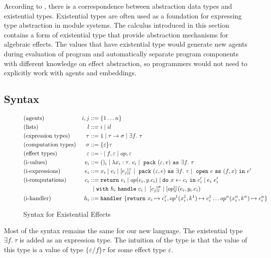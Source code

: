 According to \citet{mitchell88}, there is a correspondence between abstraction data types and existential types. Existential types are often used as a foundation for expressing type abstraction in module systems. The  calculus introduced in this section contains a form of existential type that provide abstraction mechanisms for algebraic effects.  The values that have existential type would generate new agents during evaluation of program and automatically separate program components with different knowledge on effect abstraction, so programmers would not need to explicitly work with agents and embeddings.

\subsection{Syntax}
\begin{figure}
\label{fig-syntax}
\begin{align*}
&\text{(agents)} &i, j &::= \{1 \dots n\}\\
&\text{(lists)} & l &::= i \mid il\\
&\text{(expression types)} &\tau &::= 1 \mid \tau \rightarrow \sigma \mid \exists f.\ \tau \\
&\text{(computation types)} &\sigma &::= \{\varepsilon\}\tau\\
&\text{(effect types)} &\varepsilon &::= \cdot \mid f, \varepsilon \mid op, \varepsilon\\
&\text{(i-values)} &{v_i} &::= ()_i \mid \lambda x_i:\tau.\ c_i \mid \m{pack} (\varepsilon, v) \m{as} \exists f.\ \tau\\
&\text{(i-expressions)} &e_i &::= x_i \mid v_i \mid [e_j]^\tau_l \mid \m{pack} (\varepsilon, e) \m{as} \exists f.\ \tau  \mid \m{open} e \m{as} (f, x) \m{in} e'\\
&\text{(i-computations)} &c_i &::= \texttt{return}\ e_i \mid op(e_i, y.c_i) \mid \texttt{do}\ x \leftarrow c_i\ \texttt{in}\ c_i' \mid e_i\ e_i' \\
 &\ &\ &\ \mid \texttt{with}\ h_i\ \texttt{handle}\ c_i \mid\ [c_j]^\sigma_l \mid [op]^\varepsilon_l (e_i, y_i.c_i)\\
&\text{(i-handler)} &h_i &::= \texttt{handler}\ \{\texttt{return}\ x_i \mapsto c^r_i, op^1(x_i^1, k^1) \mapsto c_i^1 \dots  op^n(x_i^n, k^n) \mapsto c_i^n\}  
\end{align*}
\caption{Syntax for Existential Effects}
\end{figure}

Most of the syntax remains the same for our new language. The existential type $\exists f.\ \tau$ is added as an expression type. The intuition of the type is that the value of this type is a value of type $\{\varepsilon/f\}\tau$ for some effect type $\varepsilon$. 

